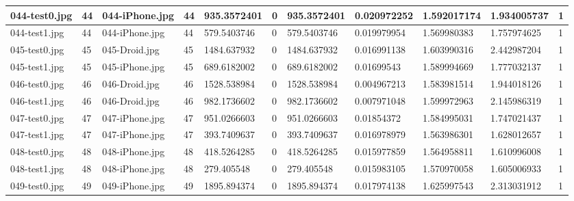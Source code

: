 \begin{landscape}
\begin{longtable}{|p{2cm}|p{1cm}|p{2cm}|p{1cm}|p{2cm}|p{1cm}|p{2cm}|p{2cm}|p{2cm}|p{2cm}|p{1cm}|}
	\hline
	044-test0.jpg & 44       & 044-iPhone.jpg & 44                   & 935.3572401   & 0                & 935.3572401         & 0.020972252   & 1.592017174   & 1.934005737       & 1         \\ 
	\hline
	044-test1.jpg & 44       & 044-iPhone.jpg & 44                   & 579.5403746   & 0                & 579.5403746         & 0.019979954   & 1.569980383   & 1.757974625       & 1         \\ 
	\hline
	045-test0.jpg & 45       & 045-Droid.jpg  & 45                   & 1484.637932   & 0                & 1484.637932         & 0.016991138   & 1.603990316   & 2.442987204       & 1         \\ 
	\hline
	045-test1.jpg & 45       & 045-iPhone.jpg & 45                   & 689.6182002   & 0                & 689.6182002         & 0.01699543    & 1.589994669   & 1.777032137       & 1         \\ 
	\hline
	046-test0.jpg & 46       & 046-Droid.jpg  & 46                   & 1528.538984   & 0                & 1528.538984         & 0.004967213   & 1.583981514   & 1.944018126       & 1         \\ 
	\hline
	046-test1.jpg & 46       & 046-Droid.jpg  & 46                   & 982.1736602   & 0                & 982.1736602         & 0.007971048   & 1.599972963   & 2.145986319       & 1         \\ 
	\hline
	047-test0.jpg & 47       & 047-iPhone.jpg & 47                   & 951.0266603   & 0                & 951.0266603         & 0.01854372    & 1.584995031   & 1.747021437       & 1         \\ 
	\hline
	047-test1.jpg & 47       & 047-iPhone.jpg & 47                   & 393.7409637   & 0                & 393.7409637         & 0.016978979   & 1.563986301   & 1.628012657       & 1         \\ 
	\hline
	048-test0.jpg & 48       & 048-iPhone.jpg & 48                   & 418.5264285   & 0                & 418.5264285         & 0.015977859   & 1.564958811   & 1.610996008       & 1         \\ 
	\hline
	048-test1.jpg & 48       & 048-iPhone.jpg & 48                   & 279.405548    & 0                & 279.405548          & 0.015983105   & 1.570970058   & 1.605006933       & 1         \\ 
	\hline
	049-test0.jpg & 49       & 049-iPhone.jpg & 49                   & 1895.894374   & 0                & 1895.894374         & 0.017974138   & 1.625997543   & 2.313031912       & 1         \\ 

\end{longtable}
\end{landscape}
